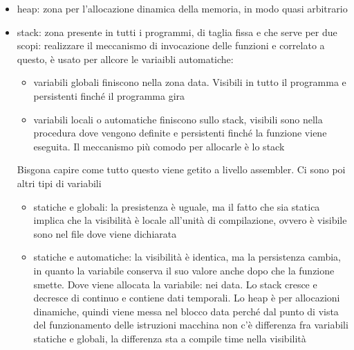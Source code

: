 \documentclass[12pt, oneside]{extbook}
\begin{document}
\begin{itemize}
\item heap: zona per l'allocazione dinamica della memoria, in modo quasi arbitrario
\item stack: zona presente in tutti i programmi, di taglia fissa e che serve per due scopi: realizzare il meccanismo di invocazione delle funzioni e correlato a questo, è usato per allcore le variaibli automatiche:
\begin{itemize}
\item variabili globali finiscono nella zona data. Visibili in tutto il programma e persistenti finché il programma gira
\item variabili locali o automatiche finiscono sullo stack, visibili sono nella procedura dove vengono definite e persistenti finché la funzione viene eseguita. Il meccanismo più comodo per allocarle è lo stack
\end{itemize}
Bisgona capire come tutto questo viene getito a livello assembler. Ci sono poi altri tipi di variabili
\begin{itemize}
\item statiche e globali: la presistenza è uguale, ma il fatto che sia statica implica che la visibilità è locale all'unità di compilazione, ovvero è visibile sono nel file dove viene dichiarata
\item statiche e automatiche: la visibilità è identica, ma la persistenza cambia, in quanto la variabile conserva il suo valore anche dopo che la funzione smette. Dove viene allocata la variabile: nei data. Lo stack cresce e decresce di continuo e contiene dati temporali. Lo heap è per allocazioni dinamiche, quindi viene messa nel blocco data perché dal punto di vista del funzionamento delle istruzioni macchina non c'è differenza fra variabili statiche e globali, la differenza sta a compile time nella visibilità 
\end{itemize}
\end{itemize}
\end{document}
